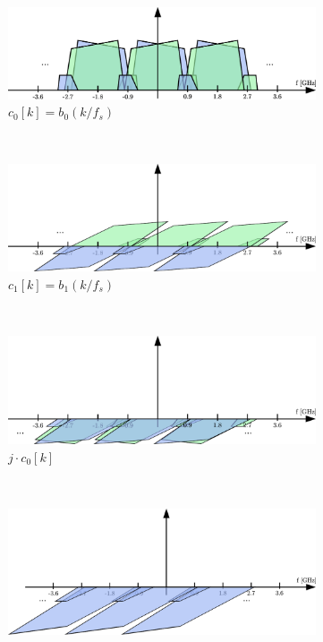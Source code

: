 \begin{figure}[p]
  \vspace{4ex} \\
  \begin{subfigure}{0.45\textwidth}
    \centering
    \includegraphics[width=\textwidth]{figures/rx_2_freq_c_0}
    \caption{$c_0[k] = b_0(k/f_s)$}
    \label{fig:rx_2_freq_c_0}
  \end{subfigure}
  ~
  \begin{subfigure}{0.45\textwidth}
    \centering
    \includegraphics[width=\textwidth]{figures/rx_2_freq_c_1}
    \caption{$c_1[k] = b_1(k / f_s)$}
    \label{fig:rx_2_freq_c_1}
  \end{subfigure}
  \vspace{4ex} \\
  \begin{subfigure}{0.45\textwidth}
    \centering
    \includegraphics[width=\textwidth]{figures/rx_2_freq_jc0}
    \caption{$j \cdot c_0[k]$}
    \label{fig:rx_2_freq_jc0}
  \end{subfigure}
  ~
  \begin{subfigure}{0.45\textwidth}
    \centering
    \includegraphics[width=\textwidth]{figures/rx_2_freq_d}

\end{subfigure}
\end{figure}
